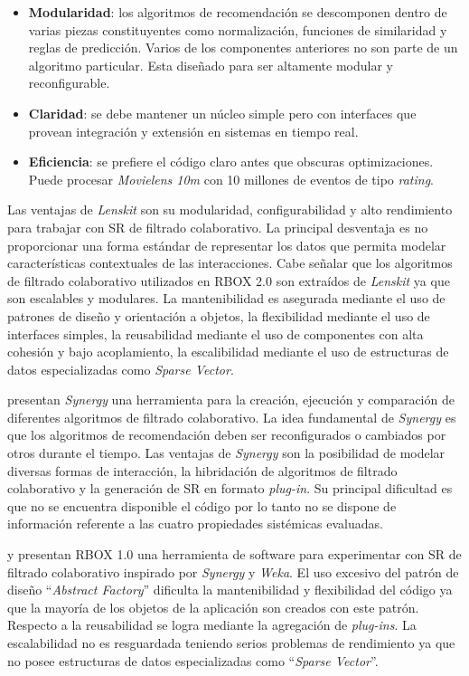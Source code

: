 \begin{itemize}
	\item \textbf{Modularidad}: los algoritmos de recomendación se descomponen dentro de varias piezas constituyentes como normalización, funciones de similaridad y reglas de predicción. Varios de los componentes anteriores no son parte de un algoritmo particular. Esta diseñado para ser altamente modular y reconfigurable.
	\item \textbf{Claridad}: se debe mantener un núcleo simple pero con interfaces que provean integración y extensión en sistemas en tiempo real.
	\item \textbf{Eficiencia}:  se prefiere el código claro antes que obscuras optimizaciones. Puede procesar \textit{Movielens 10m} con 10 millones de eventos de tipo \textit{rating}.
\end{itemize}

Las ventajas de \textit{Lenskit} son su modularidad, configurabilidad y  alto rendimiento para trabajar con SR de filtrado colaborativo. La principal desventaja es no proporcionar una forma estándar de representar los datos que permita modelar características contextuales de las interacciones. Cabe señalar que los algoritmos de filtrado colaborativo utilizados en RBOX 2.0 son extraídos de \textit{Lenskit} ya que son escalables y modulares. La mantenibilidad es asegurada mediante el uso de patrones de diseño y orientación a objetos, la flexibilidad mediante el uso de interfaces simples, la reusabilidad mediante el uso de componentes con alta cohesión y bajo acoplamiento, la escalibilidad mediante el uso de estructuras de datos especializadas como \textit{Sparse Vector}. 

\cite{Babar:2010} presentan \textit{Synergy} una herramienta para la creación, ejecución y comparación de diferentes algoritmos de filtrado colaborativo. La idea fundamental de \textit{Synergy} es que los algoritmos de recomendación deben ser reconfigurados o cambiados por otros durante el tiempo.  Las ventajas de \textit{Synergy} son la posibilidad de modelar diversas formas de interacción, la hibridación de algoritmos de filtrado colaborativo y la generación de SR en formato \textit{plug-in}. Su principal dificultad es que no se encuentra disponible el código por lo tanto no se dispone de información referente a las cuatro propiedades sistémicas evaluadas.


\cite{Cullache:2011} y \cite{Cortes:2013} presentan RBOX 1.0 una herramienta de software para experimentar con SR de filtrado colaborativo inspirado por \textit{Synergy} y \textit{Weka}. El uso excesivo del patrón de diseño ``\textit{Abstract Factory}'' dificulta la mantenibilidad y flexibilidad del código ya que la mayoría de los objetos de la aplicación son creados con este patrón. Respecto a la reusabilidad se logra mediante la agregación de \textit{plug-ins}. La escalabilidad no es resguardada teniendo serios problemas de rendimiento ya que no posee estructuras de datos especializadas como ``\textit{Sparse Vector}''.

